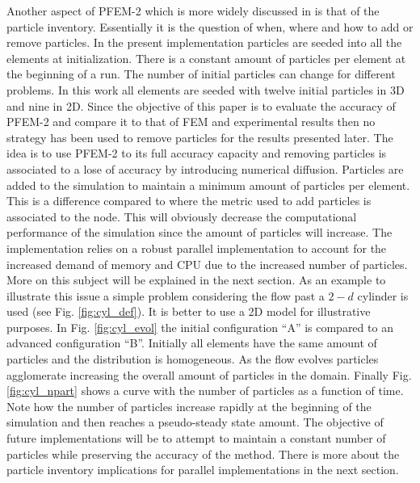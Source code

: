 Another aspect of PFEM-2 which is more widely discussed in \cite{gimenez-difusion} is that of the particle inventory. Essentially it is the question of when, where and how to add or remove particles. In the present implementation particles are seeded into all the elements at initialization. There is a constant amount of particles per element at the beginning of a run. The number of initial particles can change for different problems. In this work all elements are seeded with twelve initial particles in 3D and nine in 2D. Since the objective of this paper is to evaluate the accuracy of PFEM-2 and compare it to that of FEM and experimental results then no strategy has been used to remove particles for the results presented later. The idea is to use PFEM-2 to its full accuracy capacity and removing particles is associated to a lose of accuracy by introducing numerical diffusion. Particles are added to the simulation to maintain a minimum amount of particles per element. This is a difference compared to \cite{gimenez-difusion} where the metric used to add particles is associated to the node. This will obviously decrease the computational performance of the simulation since the amount of particles will increase. The implementation relies on a robust parallel implementation to account for the increased demand of memory and CPU due to the increased number of particles. More on this subject will be explained in the next section. As an example to illustrate this issue a simple problem considering the flow past a $2-d$ cylinder is used (see Fig. \ref{fig:cyl_def}). It is better to use a 2D model for illustrative purposes. In Fig. \ref{fig:cyl_evol} the initial configuration ``A'' is compared to an advanced configuration ``B''. Initially all elements have the same amount of particles and the distribution is homogeneous. As the flow evolves particles agglomerate increasing the overall amount of particles in the domain. Finally Fig. \ref{fig:cyl_npart} shows a curve with the number of particles as a function of time. Note how the number of particles increase rapidly at the beginning of the simulation and then reaches a pseudo-steady state amount. The objective of future implementations will be to attempt to maintain a constant number of particles while preserving the accuracy of the method. There is more about the particle inventory implications for parallel implementations in the next section.
%
